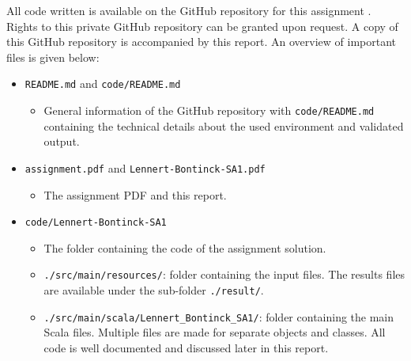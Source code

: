 All code written is available on the GitHub repository for this assignment \citep{github_project}. 
Rights to this private GitHub repository can be granted upon request. 
A copy of this GitHub repository is accompanied by this report.
An overview of important files is given below:
\begin{itemize}
    \item \texttt{README.md} and \texttt{code/README.md}
    \begin{itemize}
        \item General information of the GitHub repository with \texttt{code/README.md} containing the technical details about the used environment and validated output.
    \end{itemize}
    \item \texttt{assignment.pdf} and \texttt{Lennert-Bontinck-SA1.pdf}
    \begin{itemize}
        \item The assignment PDF and this report.
    \end{itemize}
    \item \texttt{code/Lennert-Bontinck-SA1}
    \begin{itemize}
        \item The folder containing the code of the assignment solution. 
        \item \texttt{./src/main/resources/}: folder containing the input files. The results files are available under the sub-folder \texttt{./result/}.
        \item \texttt{./src/main/scala/Lennert\_Bontinck\_SA1/}: folder containing the main Scala files. Multiple files are made for separate objects and classes. All code is well documented and discussed later in this report.
    \end{itemize}
\end{itemize}

